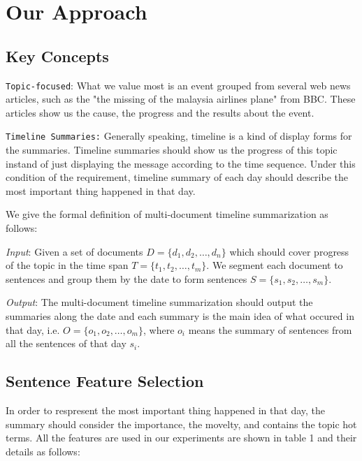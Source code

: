 \documentclass{acm_proc_article-sp}
\begin{document}
%
\section{Our Approach}
%

\subsection{Key Concepts}

\texttt{Topic-focused}: What we value most is an event grouped from several web news articles, such as the "the missing of the malaysia airlines plane" from BBC. These articles show us the cause, the progress and the results about the event. 

\texttt{Timeline Summaries:} Generally speaking, timeline is a kind of display forms for the summaries. Timeline summaries should show us the progress of this topic instand of just displaying the message according to the time sequence. Under this condition of the requirement, timeline summary of each day should describe the most important thing happened in that day.

We give the formal definition of multi-document timeline summarization as follows:

\textit{Input}: Given a set of documents $D=\{d_1, d_2, \dots, d_n\}$ which should cover progress of the topic in the time span $T=\{t_1, t_2, \dots, t_m\}$. We segment each document to sentences and group them by the date to form sentences $S=\{s_1, s_2, \dots, s_m\}$. 

\textit{Output}: The multi-document timeline summarization should output the summaries along the date and each summary is the main idea of what occured in that day, i.e. $O=\{o_1, o_2, \dots, o_m\}$, where $o_i$ means the summary of sentences from all the sentences of that day $s_i$. 


\subsection{Sentence Feature Selection}

In order to respresent the most important thing happened in that day, the summary should consider the importance, the movelty, and contains the topic hot terms. 
All the features are used in our experiments are shown in table 1 and their details as follows:
\end{document}
